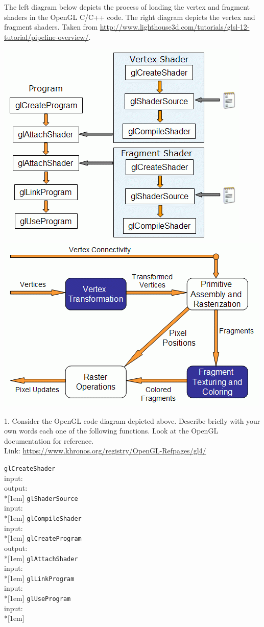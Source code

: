 \documentclass[12pt]{article}
\newcommand{\TODOL}[1]{\textcolor{red}{\underline{\hspace{#1 cm}}}}
\begin{document}
The left diagram below depicts the process of loading the vertex and fragment
shaders in the OpenGL C/C++ code. The right diagram depicts the vertex and
fragment shaders.  Taken from \href{http://www.lighthouse3d.com/tutorials/glsl-12-tutorial/pipeline-overview/}{http://www.lighthouse3d.com/tutorials/glsl-12-tutorial/pipeline-overview/}.

\includegraphics[width=.5\textwidth]{images/gpu-diagram.png}%
\includegraphics[width=.5\textwidth]{images/gpu-flow.png}

1. Consider the OpenGL code diagram depicted above. Describe briefly with your
own words each one of the following functions. Look at the OpenGL documentation
for reference. \\
Link: \href{https://www.khronos.org/registry/OpenGL-Refpages/gl4}{https://www.khronos.org/registry/OpenGL-Refpages/gl4/}

\texttt{glCreateShader}\\
input: \TODOL6\\
output: \TODOL6\\*[1em]
\texttt{glShaderSource}\\
input: \TODOL6\\*[1em]
\texttt{glCompileShader}\\
input: \TODOL6\\*[1em]
\texttt{glCreateProgram}\\
output: \TODOL6\\*[1em]
\texttt{glAttachShader}\\
input: \TODOL6\\*[1em]
\texttt{glLinkProgram}\\
input: \TODOL6\\*[1em]
\texttt{glUseProgram}\\
input: \TODOL6\\*[1em]
\end{document}
